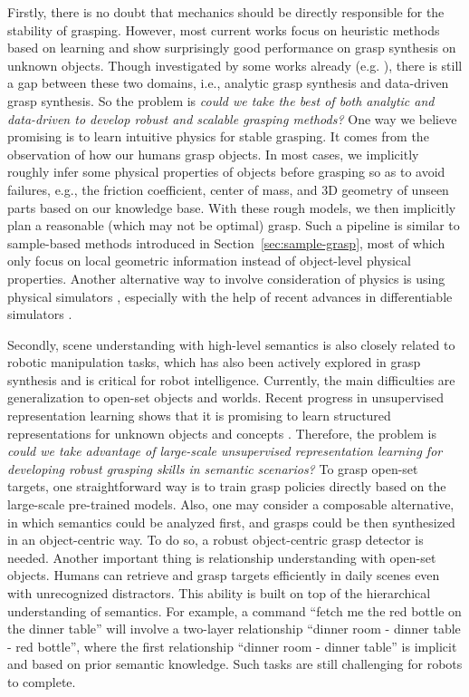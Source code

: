 \documentclass[letterpaper,10pt]{article}
\newcommand{\secref}[1]{Section~\ref{#1}}
\begin{document}
Firstly, there is no doubt that mechanics should be directly responsible for the stability of grasping.
However, most current works focus on heuristic methods based on learning and show surprisingly good performance on grasp synthesis on unknown objects.
Though investigated by some works already (e.g. \cite{mahler2017dex, liang2019pointnetgpd, ni2020pointnet++}), there is still a gap between these two domains, i.e., analytic grasp synthesis and data-driven grasp synthesis.
So the problem is {\it could we take the best of both analytic and data-driven to develop robust and scalable grasping methods?}
One way we believe promising is to learn intuitive physics \cite{kubricht2017intuitive, ye2018interpretable, riochet2018intphys} for stable grasping.
It comes from the observation of how our humans grasp objects.
In most cases, we implicitly roughly infer some physical properties of objects before grasping so as to avoid failures, e.g., the friction coefficient, center of mass, and 3D geometry of unseen parts based on our knowledge base.
With these rough models, we then implicitly plan a reasonable (which may not be optimal) grasp.
Such a pipeline is similar to sample-based methods introduced in \secref{sec:sample-grasp}, most of which only focus on local geometric information instead of object-level physical properties.
Another alternative way to involve consideration of physics is using physical simulators \cite{battaglia2013simulation}, especially with the help of recent advances in differentiable simulators \cite{hu2019chainqueen, hu2019difftaichi, werling2021fast}.

Secondly, scene understanding with high-level semantics is also closely related to robotic manipulation tasks, which has also been actively explored in grasp synthesis and is critical for robot intelligence.
Currently, the main difficulties are generalization to open-set objects and worlds.
Recent progress in unsupervised representation learning shows that it is promising to learn structured representations for unknown objects and concepts \cite{erhan2010does, radford2021learning}.
Therefore, the problem is {\it could we take advantage of large-scale unsupervised representation learning for developing robust grasping skills in semantic scenarios?}
To grasp open-set targets, one straightforward way is to train grasp policies directly based on the large-scale pre-trained models.
Also, one may consider a composable alternative, in which semantics could be analyzed first, and grasps could be then synthesized in an object-centric way.
To do so, a robust object-centric grasp detector is needed.
Another important thing is relationship understanding with open-set objects.
Humans can retrieve and grasp targets efficiently in daily scenes even with unrecognized distractors.
This ability is built on top of the hierarchical understanding of semantics.
For example, a command ``fetch me the red bottle on the dinner table'' will involve a two-layer relationship ``dinner room - dinner table - red bottle'', where the first relationship ``dinner room - dinner table'' is implicit and based on prior semantic knowledge.
Such tasks are still challenging for robots to complete.
\end{document}
